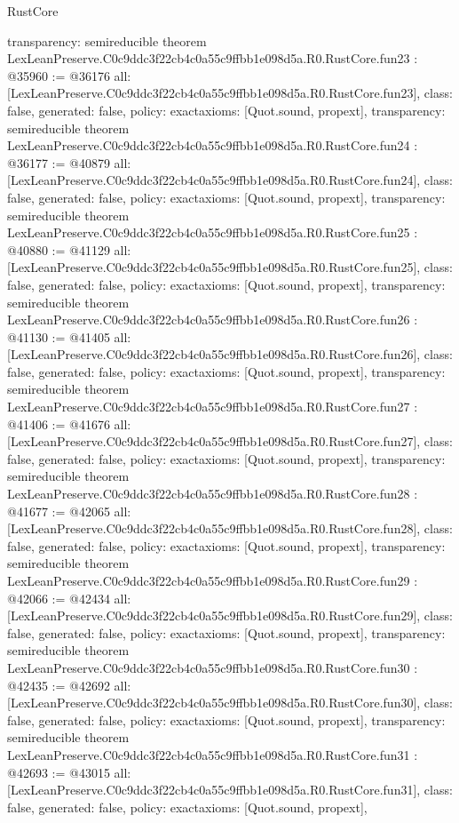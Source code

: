 \begin{lexlean}{RustCore}
\begin{coremodule}
{  transparency: semireducible
}
theorem LexLeanPreserve.C0c9ddc3f22cb4c0a55c9ffbb1e098d5a.R0.RustCore.fun23 : @35960 := @36176 {
  all: [LexLeanPreserve.C0c9ddc3f22cb4c0a55c9ffbb1e098d5a.R0.RustCore.fun23],
  class: false,
  generated: false,
  policy: exact{axioms: [Quot.sound, propext]},
  transparency: semireducible
}
theorem LexLeanPreserve.C0c9ddc3f22cb4c0a55c9ffbb1e098d5a.R0.RustCore.fun24 : @36177 := @40879 {
  all: [LexLeanPreserve.C0c9ddc3f22cb4c0a55c9ffbb1e098d5a.R0.RustCore.fun24],
  class: false,
  generated: false,
  policy: exact{axioms: [Quot.sound, propext]},
  transparency: semireducible
}
theorem LexLeanPreserve.C0c9ddc3f22cb4c0a55c9ffbb1e098d5a.R0.RustCore.fun25 : @40880 := @41129 {
  all: [LexLeanPreserve.C0c9ddc3f22cb4c0a55c9ffbb1e098d5a.R0.RustCore.fun25],
  class: false,
  generated: false,
  policy: exact{axioms: [Quot.sound, propext]},
  transparency: semireducible
}
theorem LexLeanPreserve.C0c9ddc3f22cb4c0a55c9ffbb1e098d5a.R0.RustCore.fun26 : @41130 := @41405 {
  all: [LexLeanPreserve.C0c9ddc3f22cb4c0a55c9ffbb1e098d5a.R0.RustCore.fun26],
  class: false,
  generated: false,
  policy: exact{axioms: [Quot.sound, propext]},
  transparency: semireducible
}
theorem LexLeanPreserve.C0c9ddc3f22cb4c0a55c9ffbb1e098d5a.R0.RustCore.fun27 : @41406 := @41676 {
  all: [LexLeanPreserve.C0c9ddc3f22cb4c0a55c9ffbb1e098d5a.R0.RustCore.fun27],
  class: false,
  generated: false,
  policy: exact{axioms: [Quot.sound, propext]},
  transparency: semireducible
}
theorem LexLeanPreserve.C0c9ddc3f22cb4c0a55c9ffbb1e098d5a.R0.RustCore.fun28 : @41677 := @42065 {
  all: [LexLeanPreserve.C0c9ddc3f22cb4c0a55c9ffbb1e098d5a.R0.RustCore.fun28],
  class: false,
  generated: false,
  policy: exact{axioms: [Quot.sound, propext]},
  transparency: semireducible
}
theorem LexLeanPreserve.C0c9ddc3f22cb4c0a55c9ffbb1e098d5a.R0.RustCore.fun29 : @42066 := @42434 {
  all: [LexLeanPreserve.C0c9ddc3f22cb4c0a55c9ffbb1e098d5a.R0.RustCore.fun29],
  class: false,
  generated: false,
  policy: exact{axioms: [Quot.sound, propext]},
  transparency: semireducible
}
theorem LexLeanPreserve.C0c9ddc3f22cb4c0a55c9ffbb1e098d5a.R0.RustCore.fun30 : @42435 := @42692 {
  all: [LexLeanPreserve.C0c9ddc3f22cb4c0a55c9ffbb1e098d5a.R0.RustCore.fun30],
  class: false,
  generated: false,
  policy: exact{axioms: [Quot.sound, propext]},
  transparency: semireducible
}
theorem LexLeanPreserve.C0c9ddc3f22cb4c0a55c9ffbb1e098d5a.R0.RustCore.fun31 : @42693 := @43015 {
  all: [LexLeanPreserve.C0c9ddc3f22cb4c0a55c9ffbb1e098d5a.R0.RustCore.fun31],
  class: false,
  generated: false,
  policy: exact{axioms: [Quot.sound, propext]},
}
\end{coremodule}
\end{lexlean}
